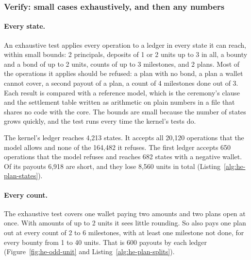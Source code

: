 \subsubsection{Verify: small cases exhaustively, and then any numbers}

\paragraph{Every state.}
An exhaustive test applies every operation to a ledger in every state it
can reach, within small bounds: 2 principals, deposits of 1 or 2 units up
to 3 in all, a bounty and a bond of up to 2 units, counts of up to 3
milestones, and 2 plans. Most of the operations it applies should be
refused: a plan with no bond, a plan a wallet cannot cover, a second
payout of a plan, a count of 4 milestones done out of 3. Each result is
compared with a reference model, which is the ceremony's clause and the
settlement table written as arithmetic on plain numbers in a file that
shares no code with the core. The bounds are small because the number of
states grows quickly, and the test runs every time the kernel's tests do.

The kernel's ledger reaches 4,213 states. It accepts all 20,120 operations
that the model allows and none of the 164,482 it refuses. The first ledger
accepts 650 operations that the model refuses and reaches 682 states with
a negative wallet. Of its payouts 6,918 are short, and they lose 8,560
units in total (Listing~\ref{alg:he-plan-states}).


\paragraph{Every count.}
The exhaustive test covers one wallet paying two amounts and two plans
open at once. With amounts of up to 2 units it sees little rounding. So
\pdkernelname{} also pays one plan out at every count of 2 to 6
milestones, with at least one milestone not done, for every bounty from 1
to 40 units. That is 600 payouts by each ledger
(Figure~\ref{fig:he-odd-unit} and Listing~\ref{alg:he-plan-splits}).




